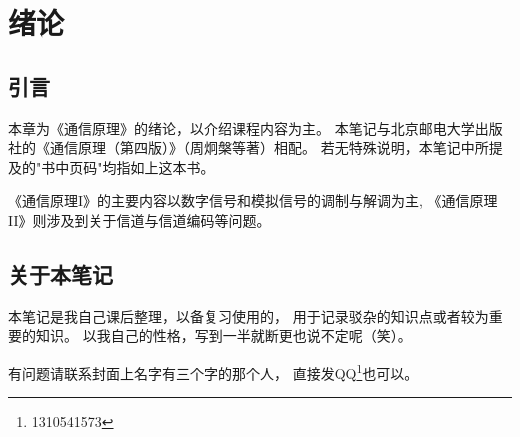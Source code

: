 \section{绪论}
\subsection{引言}
    本章为《通信原理》的绪论，以介绍课程内容为主。
    本笔记与北京邮电大学出版社的《通信原理（第四版）》（周炯槃等著）相配。
    若无特殊说明，本笔记中所提及的"书中页码"均指如上这本书。

    《通信原理I》的主要内容以数字信号和模拟信号的调制与解调为主,
    《通信原理II》则涉及到关于信道与信道编码等问题。

\subsection{关于本笔记}
    本笔记是我自己课后整理，以备复习使用的，
    用于记录驳杂的知识点或者较为重要的知识。
    以我自己的性格，写到一半就断更也说不定呢（笑）。

    有问题请联系封面上名字有三个字的那个人，
    直接发QQ\footnote{1310541573}也可以。
    
    
